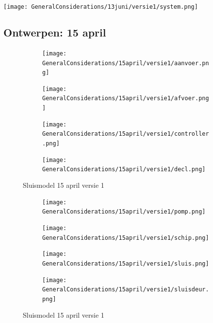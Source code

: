 \documentclass{article}
\begin{document}
	\texttt{[image: GeneralConsiderations/13juni/versie1/system.png]}
	
	
	\newpage
	\subsection{Ontwerpen: 15 april}
	\begin{figure}
		\centering
		\begin{subfigure}{0.45\linewidth}
			\texttt{[image: GeneralConsiderations/15april/versie1/aanvoer.png]}
			\caption{}
			\label{fig:1a}
		\end{subfigure}\hfill
		\begin{subfigure}{0.45\linewidth}
			\texttt{[image: GeneralConsiderations/15april/versie1/afvoer.png]}
			\caption{}
			\label{fig:1a}
		\end{subfigure}
		
		\begin{subfigure}{0.45\linewidth}
			\texttt{[image: GeneralConsiderations/15april/versie1/controller.png]}
			\caption{}
			\label{fig:1a}
		\end{subfigure}\hfill
		\begin{subfigure}{0.45\linewidth}
			\texttt{[image: GeneralConsiderations/15april/versie1/decl.png]}
			\caption{}
			\label{fig:1a}
		\end{subfigure}
		\caption{Sluismodel 15 april versie 1}
		\label{fig:1}
	\end{figure}
	
	\begin{figure}
		\centering
		\begin{subfigure}{0.45\linewidth}
			\texttt{[image: GeneralConsiderations/15april/versie1/pomp.png]}
			\caption{}
			\label{fig:1a}
		\end{subfigure}\hfill
		\begin{subfigure}{0.45\linewidth}
			\texttt{[image: GeneralConsiderations/15april/versie1/schip.png]}
			\caption{}
			\label{fig:1a}
		\end{subfigure}
		
		\begin{subfigure}{0.45\linewidth}
			\texttt{[image: GeneralConsiderations/15april/versie1/sluis.png]}
			\caption{}
			\label{fig:1a}
		\end{subfigure}\hfill
		\begin{subfigure}{0.45\linewidth}
			\texttt{[image: GeneralConsiderations/15april/versie1/sluisdeur.png]}
			\caption{}
			\label{fig:1a}
		\end{subfigure}
		\caption{Sluismodel 15 april versie 1}
		\label{fig:1}
	\end{figure}
	
\end{document}
